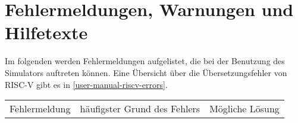 
\section{Fehlermeldungen, Warnungen und Hilfetexte}

Im folgenden werden Fehlermeldungen aufgelistet, die bei der Benutzung des Simulators auftreten können.
Eine Übersicht über die Übersetzungsfehler von RISC-V gibt es in \autoref{user-manual-riscv-errors}.

\begin{tabular}{|l|l|l|}
	\hline
	Fehlermeldung & häufigster Grund des Fehlers & Mögliche Lösung\\
\end{tabular}